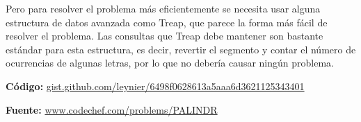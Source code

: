 \documentclass[12pt]{article}
\newcommand{\nl}{\vspace{0.3cm}}
\begin{document}
Pero para resolver el problema más eficientemente se necesita usar alguna estructura de datos avanzada como Treap, que parece la forma más fácil de resolver el problema. Las consultas que Treap debe mantener son bastante estándar para esta estructura, es decir, revertir el segmento y contar el número de ocurrencias de algunas letras, por lo que no debería causar ningún problema.

\nl

\textbf{Código:} \href{https://gist.github.com/leynier/6498f0628613a5aaa6d3621125343401}{gist.github.com/leynier/6498f0628613a5aaa6d3621125343401}

\nl

\textbf{Fuente:} \href{https://www.codechef.com/problems/PALINDR}{www.codechef.com/problems/PALINDR}

\newpage

\nocite{*}


\end{document}
